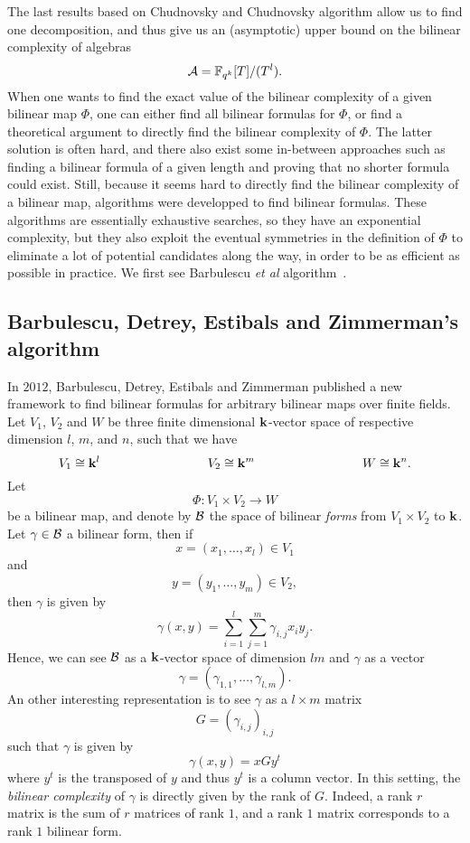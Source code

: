 The last results based on Chudnovsky and Chudnovsky algorithm allow us to find
one decomposition, and thus give us an (asymptotic) upper bound on the bilinear
complexity of algebras
\[
  \mathcal{A} = \mathbb{F}_{q^k}[T]/(T^l).
\]
When one wants to find the exact value of the bilinear complexity of a given
bilinear map $\Phi$, one can either find all bilinear formulas for $\Phi$, or
find a theoretical argument to directly find the bilinear complexity of $\Phi$. The latter
solution is often hard, and there also exist some in-between approaches such
as finding a bilinear formula of a given length and proving that no shorter formula
could exist. Still, because it seems hard to directly find the bilinear
complexity of a bilinear map, algorithms were developped to find bilinear
formulas. These algorithms are essentially exhaustive searches, so they 
have an exponential complexity, but they also exploit the eventual symmetries
in the definition of $\Phi$ to eliminate a lot of potential candidates along the
way, in order to be as efficient as possible in practice. We first see
Barbulescu \emph{et al} algorithm~\cite{BDEZ12}.

\subsection{Barbulescu, Detrey, Estibals and Zimmerman's algorithm}

In $2012$, Barbulescu, Detrey, Estibals and Zimmerman published a new framework
to find bilinear formulas for arbitrary bilinear maps over finite fields. Let
$V_1$, $V_2$ and $W$ be three finite dimensional $\mathbf{k}$-vector space of respective
dimension $l$, $m$, and $n$, such that we have
\[
  V_1\cong\K^l\hspace{3cm}V_2\cong\K^m\hspace{3cm}W\cong\K^n.
\]
Let
\[
  \Phi:V_1\times V_2\to W
\]
be a bilinear map, and denote by $\mathcal{B}$ the space of bilinear \emph{forms} from
$V_1\times V_2$ to $\mathbf{k}$. Let $\gamma\in\mathcal{B}$ a bilinear form, then if
\[
  x = (x_1, \dots, x_l)\in V_1
\]
and
\[
  y = (y_1, \dots, y_m)\in V_2,
\]
then $\gamma$ is given by
\[
  \gamma(x, y) = \sum_{i=1}^{l}\sum_{j=1}^m \gamma_{i, j} x_i y_j.
\]
Hence, we can see $\mathcal{B}$ as a $\mathbf{k}$-vector space of dimension $lm$ and $\gamma$ as
a vector
\[
  \gamma = (\gamma_{1, 1}, \dots, \gamma_{l, m}).
\]
An other interesting representation is to see $\gamma$ as a $l\times m$ matrix
\[
  G = (\gamma_{i, j})_{i, j}
\]
such that $\gamma$ is given by
\[
  \gamma(x, y) = x G y^t
\]
where $y^t$ is the transposed of $y$ and thus $y^t$ is a column vector. In this
setting, the \emph{bilinear complexity} of $\gamma$ is directly given by the
rank of $G$. Indeed, a rank $r$ matrix is the sum of $r$ matrices of rank $1$,
and a rank $1$ matrix corresponds to a rank $1$ bilinear form.
% 
